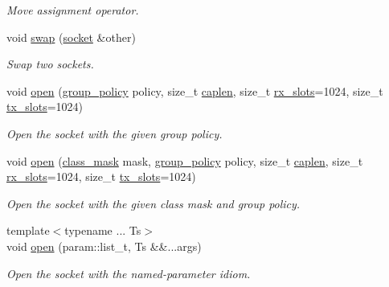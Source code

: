 \begin{DoxyCompactItemize}
\begin{DoxyCompactList}\small\item\em Move assignment operator. \end{DoxyCompactList}\item 
void \hyperlink{classpfq_1_1socket_ac80ebddf3a94f7964c74bf02954704ce}{swap} (\hyperlink{classpfq_1_1socket}{socket} \&other)
\begin{DoxyCompactList}\small\item\em Swap two sockets. \end{DoxyCompactList}\item 
void \hyperlink{classpfq_1_1socket_a432ea40ac382d251b105e3d5987b9b4a}{open} (\hyperlink{namespacepfq_ac41249c8510558905b01fa4d866a38d7}{group\+\_\+policy} policy, size\+\_\+t \hyperlink{classpfq_1_1socket_ab68dbba5ef01041b9c96758c4a9f0a6c}{caplen}, size\+\_\+t \hyperlink{classpfq_1_1socket_a5cf700fc12d67b91df3d669ac4aa737a}{rx\+\_\+slots}=1024, size\+\_\+t \hyperlink{classpfq_1_1socket_a019d15a072c043d6a1333ca0c836da4c}{tx\+\_\+slots}=1024)
\begin{DoxyCompactList}\small\item\em Open the socket with the given group policy. \end{DoxyCompactList}\item 
void \hyperlink{classpfq_1_1socket_ab86880ccdfdd9f875e376c6c8d22a2bb}{open} (\hyperlink{namespacepfq_a96af1f5ed530eff563eb917516758fbb}{class\+\_\+mask} mask, \hyperlink{namespacepfq_ac41249c8510558905b01fa4d866a38d7}{group\+\_\+policy} policy, size\+\_\+t \hyperlink{classpfq_1_1socket_ab68dbba5ef01041b9c96758c4a9f0a6c}{caplen}, size\+\_\+t \hyperlink{classpfq_1_1socket_a5cf700fc12d67b91df3d669ac4aa737a}{rx\+\_\+slots}=1024, size\+\_\+t \hyperlink{classpfq_1_1socket_a019d15a072c043d6a1333ca0c836da4c}{tx\+\_\+slots}=1024)
\begin{DoxyCompactList}\small\item\em Open the socket with the given class mask and group policy. \end{DoxyCompactList}\item 
{\footnotesize template$<$typename ... Ts$>$ }\\void \hyperlink{classpfq_1_1socket_a33c3e305c62f5a9f8a0ef74f69097ecf}{open} (param\+::list\+\_\+t, Ts \&\&...args)
\begin{DoxyCompactList}\small\item\em Open the socket with the named-\/parameter idiom. \end{DoxyCompactList}\item 

\end{DoxyCompactItemize}
